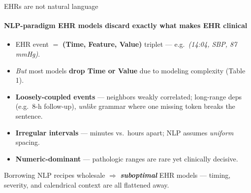 \documentclass[10pt, aspectratio=169, t]{beamer}   %
\newcommand{\warn}[1]{{\color{negmag}\bfseries #1}}   %
\begin{document}
\begin{frame}{EHRs are not natural language}
  \framesubtitle{NLP-paradigm EHR models discard exactly what makes EHR clinical}
  \vfill
  \begin{itemize}\setlength{\itemsep}{8pt}
    \item EHR event $=$ \textbf{(Time, Feature, Value)} triplet --- e.g.\ \emph{(14:04, SBP, 87\,mmHg)}.
    \item \emph{But} most models \warn{\textbf{drop Time or Value}} due to modeling complexity (Table 1).
    \item \textbf{Loosely-coupled events} --- neighbors weakly correlated; long-range deps (e.g.\ 8-h follow-up), \emph{unlike} grammar where one missing token breaks the sentence.
    \item \textbf{Irregular intervals} --- minutes vs.\ hours apart; NLP assumes \emph{uniform} spacing.
    \item \textbf{Numeric-dominant} --- pathologic ranges are rare yet clinically decisive.
  \end{itemize}
  \vfill
  \begin{tcolorbox}[title={Why it matters}]
    Borrowing NLP recipes wholesale $\Rightarrow$ \warn{\emph{suboptimal}} EHR models --- timing, severity, and calendrical context are all flattened away.
  \end{tcolorbox}
  \vfill
\end{frame}
\end{document}
